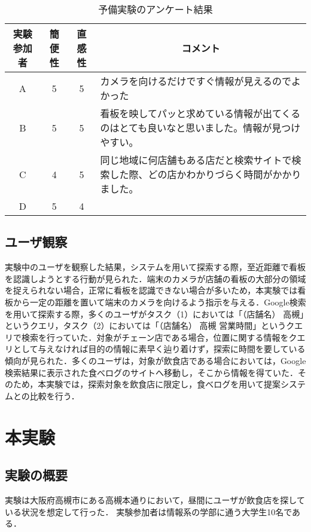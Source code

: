     \begin{table}
      \begin{center}
        \caption{予備実験のアンケート結果}
        \label{table:exp_sbs_pre_questionnaire}
        \begin{tabular}{c|ccp{9cm}}
          \hline \hline
          実験参加者 & 簡便性 & 直感性 & \multicolumn{1}{c}{コメント} \\
          \hline
          A & 5 & 5 & カメラを向けるだけですぐ情報が見えるのでよかった \\
          B & 5 & 5 & 看板を映してパッと求めている情報が出てくるのはとても良いなと思いました。情報が見つけやすい。 \\
          C & 4 & 5 & 同じ地域に何店舗もある店だと検索サイトで検索した際、どの店かわかりづらく時間がかかりました。 \\
          D & 5 & 4 & \\
          \hline
        \end{tabular}
      \end{center}
    \end{table}

  \subsection{ユーザ観察}
    実験中のユーザを観察した結果，システムを用いて探索する際，至近距離で看板を認識しようとする行動が見られた．端末のカメラが店舗の看板の大部分の領域を捉えられない場合，正常に看板を認識できない場合が多いため，本実験では看板から一定の距離を置いて端末のカメラを向けるよう指示を与える．Google検索を用いて探索する際，多くのユーザがタスク（1）においては「（店舗名） 高槻」というクエリ，タスク（2）においては「（店舗名） 高槻 営業時間」というクエリで検索を行っていた．対象がチェーン店である場合，位置に関する情報をクエリとして与えなければ目的の情報に素早く辿り着けず，探索に時間を要している傾向が見られた．多くのユーザは，対象が飲食店である場合においては，Google検索結果に表示された食べログのサイトへ移動し，そこから情報を得ていた．そのため，本実験では，探索対象を飲食店に限定し，食べログを用いて提案システムとの比較を行う．

\section{本実験}
  \subsection{実験の概要}
    実験は大阪府高槻市にある高槻本通りにおいて，昼間にユーザが飲食店を探している状況を想定して行った．
    実験参加者は情報系の学部に通う大学生10名である．

